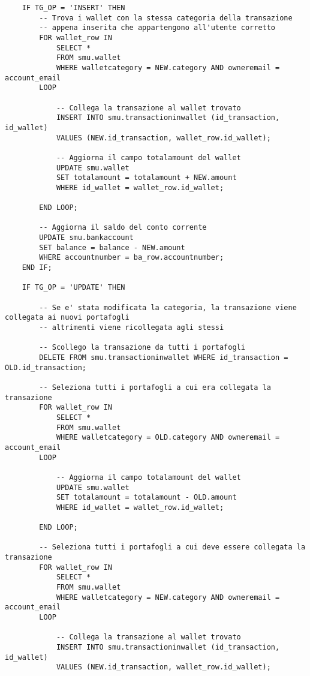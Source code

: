 \begin{lstlisting}
    IF TG_OP = 'INSERT' THEN
        -- Trova i wallet con la stessa categoria della transazione
        -- appena inserita che appartengono all'utente corretto
        FOR wallet_row IN
            SELECT *
            FROM smu.wallet
            WHERE walletcategory = NEW.category AND owneremail = account_email
        LOOP

            -- Collega la transazione al wallet trovato
            INSERT INTO smu.transactioninwallet (id_transaction, id_wallet)
            VALUES (NEW.id_transaction, wallet_row.id_wallet);

            -- Aggiorna il campo totalamount del wallet
            UPDATE smu.wallet
            SET totalamount = totalamount + NEW.amount
            WHERE id_wallet = wallet_row.id_wallet;

        END LOOP;

        -- Aggiorna il saldo del conto corrente
        UPDATE smu.bankaccount
        SET balance = balance - NEW.amount
        WHERE accountnumber = ba_row.accountnumber;
    END IF;

    IF TG_OP = 'UPDATE' THEN

        -- Se e' stata modificata la categoria, la transazione viene collegata ai nuovi portafogli
        -- altrimenti viene ricollegata agli stessi

        -- Scollego la transazione da tutti i portafogli
        DELETE FROM smu.transactioninwallet WHERE id_transaction = OLD.id_transaction;
        
        -- Seleziona tutti i portafogli a cui era collegata la transazione
        FOR wallet_row IN
            SELECT *
            FROM smu.wallet
            WHERE walletcategory = OLD.category AND owneremail = account_email
        LOOP

            -- Aggiorna il campo totalamount del wallet
            UPDATE smu.wallet
            SET totalamount = totalamount - OLD.amount
            WHERE id_wallet = wallet_row.id_wallet;

        END LOOP;

        -- Seleziona tutti i portafogli a cui deve essere collegata la transazione
        FOR wallet_row IN
            SELECT *
            FROM smu.wallet
            WHERE walletcategory = NEW.category AND owneremail = account_email
        LOOP

            -- Collega la transazione al wallet trovato
            INSERT INTO smu.transactioninwallet (id_transaction, id_wallet)
            VALUES (NEW.id_transaction, wallet_row.id_wallet);


\end{lstlisting}
